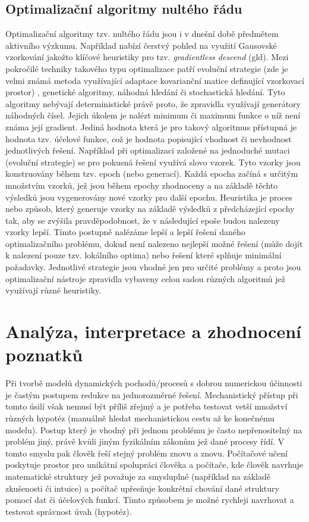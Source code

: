 \section{Optimalizační algoritmy nultého řádu}
\label{sec:opt_alg}
Optimalizační algoritmy tzv. nultého řádu jsou i v dnešní době předmětem
aktivního výzkumu. Například \cite{golovin2019gradientless} nabízí čerstvý
pohled na využití Gausovské vzorkování jakožto klíčové heuristiky pro
tzv. \textit{gradientless descend} (\acrshort{gld}). Mezi pokročilé techniky
takového typu optimalizace patří evoluční strategie (zde je velmi známá metoda
využívající adaptace kovarianční matice definující vzorkovací prostor)
\cite{hansen2016cma}, genetické algoritmy, náhodná hledání či stochastická
hledání. Tyto algoritmy nebývají deterministické právě proto, že zpravidla
využívají generátory náhodných čísel. Jejich úkolem je nalézt minimum či
maximum funkce o níž není známa její gradient. Jediná hodnota která je pro
takový algoritmus přístupná je hodnota tzv. účelové funkce, což je hodnota
popisující vhodnost či nevhodnost jednotlivých řešení. Například při
optimalizaci založené na jednoduché mutaci (evoluční strategie) se pro pokusná
řešení využívá slovo vzorek. Tyto vzorky jsou konstruovány během tzv. epoch
(nebo generací). Každá epocha začíná s určitým množstvím vzorků, jež jsou během
epochy zhodnoceny a na základě těchto výsledků jsou vygenerovány nové vzorky
pro další epochu. Heuristika je proces nebo způsob, který generuje vzorky na
základě výsledků z předcházející epochy tak, aby se zvýšila pravděpodobnost, že
v následující epoše budou nalezeny vzorky lepší. Tímto postupně nalézáme lepší
a lepší řešení daného optimalizačního problému, dokud není nalezeno nejlepší
možné řešení (může dojít k nalezení pouze tzv. lokálního optima) nebo řešení
které splňuje minimální požadavky. Jednotlivé strategie jsou vhodné jen pro
určité problémy a proto jsou optimalizační nástroje zpravidla vybaveny celou
sadou různých algoritmů jež využívají různé heuristiky.

\chapter{Analýza, interpretace a zhodnocení poznatků}
Při tvorbě modelů dynamických pochodů/procesů s dobrou numerickou
účinnosti je častým postupem redukce na jednorozměrné řešení. Mechanistický
přístup při tomto úsilí však nemusí být příliš zřejmý a je potřeba testovat
vetší množství různých hypotéz (manuálně hledat mechanistickou cestu až ke
konečnému modelu). Postup který je vhodný při jednom problému je
často nepřenositelný na problém jiný, právě kvůli jiným fyzikálním zákonům jež
dané procesy řídí. V tomto smyslu pak člověk řeší stejný problém znovu a znovu.
Počítačové učení poskytuje prostor pro unikátní spolupráci člověka a počítače,
kde člověk navrhuje matematické struktury jež považuje za smysluplné (například
na základě zkušenosti či intuice) a počítač upřesňuje konkrétní chování dané
struktury pomocí dat či účelových funkcí. Tímto způsobem je možné rychleji
navrhovat a testovat správnost úvah (hypotéz).


